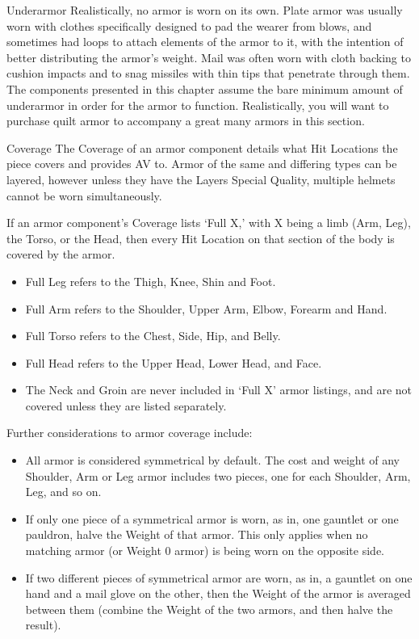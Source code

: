 \documentclass[oneside,11pt,english]{book}
\begin{document}
Underarmor 
Realistically, no armor is worn on its own. Plate armor was usually worn with clothes specifically 
designed to pad the wearer from blows, and sometimes had loops to attach elements of the armor to it, 
with the intention of better distributing the armor’s weight. Mail was often worn with cloth backing to 
cushion impacts and to snag missiles with thin tips that penetrate through them. 
The components presented in this chapter assume the bare minimum amount of underarmor in order for 
the armor to function. Realistically, you will want to purchase quilt armor to accompany a great many 
armors in this section. 

 

Coverage 
The Coverage of an armor component details what Hit Locations the piece covers and provides AV to. 
Armor of the same and differing types can be layered, however unless they have the Layers Special 
Quality, multiple helmets cannot be worn simultaneously. 

 

If an armor component’s Coverage lists ‘Full X,’ with X being a limb (Arm, Leg), the Torso, or the Head, 
then every Hit Location on that section of the body is covered by the armor. 
\begin{itemize}
\item Full Leg refers to the Thigh, Knee, Shin and Foot. 
\item Full Arm refers to the Shoulder, Upper Arm, Elbow, Forearm and Hand. 
\item Full Torso refers to the Chest, Side, Hip, and Belly. 
\item Full Head refers to the Upper Head, Lower Head, and Face. 
\item The Neck and Groin are never included in ‘Full X’ armor listings, and are not covered unless they 
are listed separately. 
\end{itemize}
 

Further considerations to armor coverage include: 
\begin{itemize}
\item All armor is considered symmetrical by default. The cost and weight of any Shoulder, Arm or 
Leg armor includes two pieces, one for each Shoulder, Arm, Leg, and so on. 
\item If only one piece of a symmetrical armor is worn, as in, one gauntlet or one pauldron, halve the 
Weight of that armor. This only applies when no matching armor (or Weight 0 armor) is being 
worn on the opposite side. 
\item If two different pieces of symmetrical armor are worn, as in, a gauntlet on one hand and a 
mail glove on the other, then the Weight of the armor is averaged between them (combine the 
Weight of the two armors, and then halve the result). 
\end{itemize}
 
\end{document}
